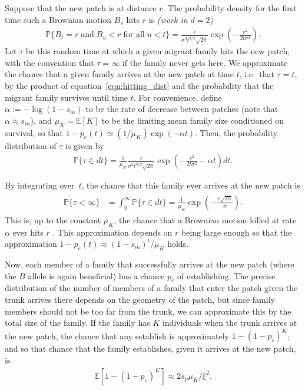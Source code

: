 \documentclass{article}
\renewcommand{\P}{\mathbb{P}}
\newcommand{\E}{\mathbb{E}}
\newcommand{\deq}{\stackrel{\scriptscriptstyle{d}}{=}}
\newcommand{\plr}[1]{{\it\color{blue}(#1)}}
\begin{document}
Suppose that the new patch is at distance $r$.
The probability density for the first time such a Brownian motion $B_s$ hits $r$ is
\citep[XXX]{feller}
\plr{work in $d=2$}
\begin{align} \label{eqn:hitting_dist}
  \P\{ B_t=r \;\mbox{and} \; B_u<r \;\mbox{for all}\; u<t\} =  \frac{r}{\sigma^3 t^{3/2}\sqrt{2\pi}} \exp\left(-\frac{r^2}{2t\sigma^2}\right) .
\end{align}
Let $\tau$ be this random time at which a given migrant family hits the new patch,
with the convention that $\tau =\infty$ if the family never gets here.
We approximate the chance that a given family arrives at the new patch at time $t$, i.e.\ that $\tau=t$,
by the product of equation~\eqref{eqn:hitting_dist} and the probability that the migrant family survives until time $t$.
For convenience, define $\alpha := - \log(1-s_m)$ to be the rate of decrease between patches (note that $\alpha \approx s_m$),
and $\mu_K = \E[K]$ to be the limiting mean family size conditioned on survival,
so that $1-p_e(t) \simeq (1/\mu_K) \exp(-\alpha t)$.
Then, the probability distribution of $\tau$ is given by
\begin{align}
    \P\{ \tau \in dt \} =  \frac{1}{\mu_K} \frac{r}{\sigma^3 t^{3/2}\sqrt{2\pi}} \exp\left(-\frac{r^2}{2t\sigma^2} - \alpha t \right) dt  .
\end{align}

By integrating over~$t$, the chance that this family ever arrives at the new patch is
\begin{align} 
\label{eqn:estab_prob}
  \begin{split}
      \P\{ \tau < \infty \} &= \int_0^\infty \P\{ \tau \in dt \} = \frac{1}{\mu_K} \exp\left( - \frac{ r \sqrt{2 \alpha}}{\sigma} \right) .
  \end{split}
\end{align}
This is, up to the constant $\mu_K$, the chance that a Brownian motion killed at rate $\alpha$
ever hits $r$ \citep{feller}.
This approximation depends on $r$ being large enough so that the approximation $1-p_e(t) \approx (1-s_m)^t/\mu_K$ holds.

Now, each member of a family that successfully arrives at the new patch
(where the $B$ allele is again beneficial)
has a chance $p_e$ of establishing.
The precise distribution of the number of members of a family that enter the patch
given the trunk arrives there
depends on the geometry of the patch,
but since family members should not be too far from the trunk,
we can approximate this by the total size of the family.
If the family has $K$ individuals when the trunk arrives at the new patch,
the chance that any establish is approximately $1-(1-p_e)^K$;
and so that chance that the family establishes, given it arrives at the new patch, 
is 
\begin{align}
    \label{eqn:prob_estab_arrival}
    \E[1-(1-p_e)^K] \approx 2 s_p \mu_K/\xi^2 .
\end{align}
\end{document}
